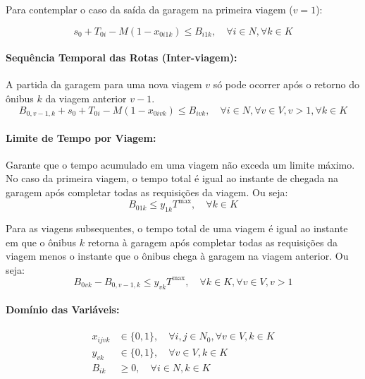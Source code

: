 \documentclass[12pt, a4paper]{article}
\begin{document}
\noindent Para contemplar o caso da saída da garagem na primeira viagem ($v=1$):

\begin{equation}
    s_0 + T_{0i} - M(1 - x_{0i1k}) \le B_{i1k}, \quad \forall i \in N, \forall k \in K
\end{equation}

\paragraph{Sequência Temporal das Rotas (Inter-viagem):} A partida da garagem para uma nova viagem $v$ só pode ocorrer após o retorno do ônibus $k$ da viagem anterior $v-1$.
\begin{equation}
    B_{0,v-1,k} + s_0 + T_{0i} - M(1 - x_{0ivk}) \le B_{ivk}, \quad \forall i \in N, \forall v \in V, v > 1, \forall k \in K
\end{equation}

\paragraph{Limite de Tempo por Viagem:} Garante que o tempo acumulado em uma viagem não exceda um limite máximo. No caso da primeira viagem, o tempo total é igual ao instante de chegada na garagem após completar todas as requisições da viagem. Ou seja:
\begin{equation}
B_{01k} \le y_{1k} T^{\max}, \quad \forall k \in K
\end{equation}

\noindent Para as viagens subsequentes, o tempo total de uma viagem é igual ao instante em que o ônibus $k$ retorna à garagem após completar todas as requisições da viagem menos o instante que o ônibus chega à garagem na viagem anterior. Ou seja:
\begin{equation}
B_{0vk} - B_{0,v-1,k} \le y_{vk} T^{\max}, \quad \forall k \in K, \forall v \in V, v > 1
\end{equation}

\paragraph{Domínio das Variáveis:}
\begin{align}
x_{ijvk} &\in \{0, 1\}, \quad \forall i,j \in N_0, \forall v \in V, k \in K \\
y_{vk} &\in \{0, 1\}, \quad \forall v \in V, k \in K \\
B_{ik} &\ge 0, \quad \forall i \in N, k \in K
\end{align}
\end{document}
